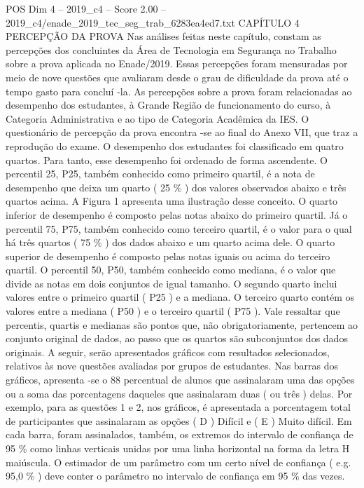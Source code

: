 \begin{textsample}{POS Dim 4 – 2019\_c4 – Score 2.00 – 2019\_c4/enade\_2019\_tec\_seg\_trab\_6283ea4ed7.txt}  \label{ex:f4_pos_119}
CAPÍTULO 4 PERCEPÇÃO DA PROVA Nas análises feitas neste capítulo, constam as percepções dos concluintes da Área de Tecnologia em Segurança no Trabalho sobre a prova aplicada no Enade/2019.
Essas percepções foram mensuradas por meio de nove questões que avaliaram desde o grau de dificuldade da prova até o tempo gasto para concluí -la.
As percepções sobre a prova foram relacionadas ao desempenho dos estudantes, à Grande Região de funcionamento do curso, à Categoria Administrativa e ao tipo de Categoria Acadêmica da IES.
O questionário de percepção da prova encontra -se ao final do Anexo VII, que traz a reprodução do exame.
O desempenho dos estudantes foi classificado em quatro quartos.
Para tanto, esse desempenho foi ordenado de forma ascendente.
O percentil 25, P25, também conhecido como primeiro quartil, é a nota de desempenho que deixa um quarto ( 25 \% ) dos valores observados abaixo e três quartos acima.
A Figura 1 apresenta uma ilustração desse conceito.
O quarto inferior de desempenho é composto pelas notas abaixo do primeiro quartil.
Já o percentil 75, P75, também conhecido como terceiro quartil, é o valor para o qual há três quartos ( 75 \% ) dos dados abaixo e um quarto acima dele.
O quarto superior de desempenho é composto pelas notas iguais ou acima do terceiro quartil.
O percentil 50, P50, também conhecido como mediana, é o valor que divide as notas em dois conjuntos de igual tamanho.
O segundo quarto inclui valores entre o primeiro quartil ( P25 ) e a mediana.
O terceiro quarto contém os valores entre a mediana ( P50 ) e o terceiro quartil ( P75 ).
Vale ressaltar que percentis, quartis e medianas são pontos que, não obrigatoriamente, pertencem ao conjunto original de dados, ao passo que os quartos são subconjuntos dos dados originais.
A seguir, serão apresentados gráficos com resultados selecionados, relativos às nove questões avaliadas por grupos de estudantes.
Nas barras dos gráficos, apresenta -se o 88 percentual de alunos que assinalaram uma das opções ou a soma das porcentagens daqueles que assinalaram duas ( ou três ) delas.
Por exemplo, para as questões 1 e 2, nos gráficos, é apresentada a porcentagem total de participantes que assinalaram as opções ( D ) Difícil e ( E ) Muito difícil.
Em cada barra, foram assinalados, também, os extremos do intervalo de confiança de 95 \% como linhas verticais unidas por uma linha horizontal na forma da letra H maiúscula.
O estimador de um parâmetro com um certo nível de confiança ( e.g. 95,0 \% ) deve conter o parâmetro no intervalo de confiança em 95 \% das vezes.

\end{textsample}
